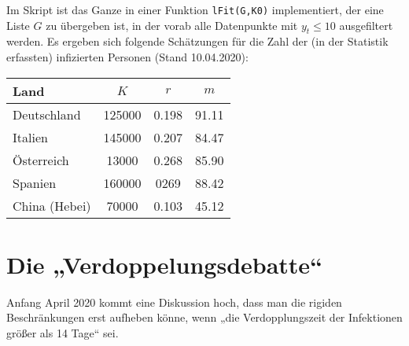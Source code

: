 \documentclass[a4paper,11pt]{article}
\begin{document}
Im Skript ist das Ganze in einer Funktion \texttt{lFit(G,K0)} implementiert,
der eine Liste $G$ zu übergeben ist, in der vorab alle Datenpunkte mit $y_t\le
10$ ausgefiltert werden.  Es ergeben sich folgende Schätzungen für die Zahl
der (in der Statistik erfassten) infizierten Personen (Stand 10.04.2020):
\begin{center}
  \begin{tabular}{|l|c|c|c|}\hline
    Land & $K$ & $r$ & $m$ \\\hline
    Deutschland & 125000 & 0.198 & 91.11\\
    Italien & 145000 & 0.207 & 84.47\\
    Österreich & 13000 & 0.268 & 85.90 \\
    Spanien & 160000 & 0269 & 88.42 \\
    China (Hebei) & 70000 & 0.103 & 45.12\\\hline
  \end{tabular}
\end{center}

\section{Die „Verdoppelungsdebatte“}

Anfang April 2020 kommt eine Diskussion hoch, dass man die rigiden
Beschränkungen erst aufheben könne, wenn „die Verdopplungszeit der Infektionen
größer als 14 Tage“ sei.
\end{document}
